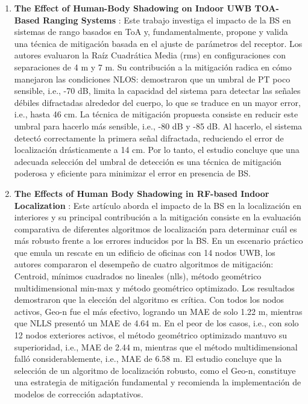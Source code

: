 \begin{enumerate}
    \item \textbf{The Effect of Human-Body Shadowing on Indoor UWB TOA-Based Ranging Systems} \cite{ref18}: Este trabajo investiga el impacto de la BS en sistemas de rango basados en ToA y, fundamentalmente, propone y valida una técnica de mitigación basada en el ajuste de parámetros del receptor. Los autores evaluaron la Raíz Cuadrática Media (\gls{rms}) en configuraciones con separaciones de 4 m y 7 m. Su contribución a la mitigación radica en cómo manejaron las condiciones NLOS: demostraron que un umbral de PT poco sensible, i.e., -70 dB, limita la capacidad del sistema para detectar las señales débiles difractadas alrededor del cuerpo, lo que se traduce en un mayor error, i.e., hasta 46 cm. La técnica de mitigación propuesta consiste en reducir este umbral para hacerlo más sensible, i.e., -80 dB y -85 dB. Al hacerlo, el sistema detectó correctamente la primera señal difractada, reduciendo el error de localización drásticamente a 14 cm. Por lo tanto, el estudio concluye que una adecuada selección del umbral de detección es una técnica de mitigación poderosa y eficiente para minimizar el error en presencia de BS.

    \item \textbf{The Effects of Human Body Shadowing in RF-based Indoor Localization} \cite{Schimtt2019}: 
    Este artículo aborda el impacto de la BS en la localización en interiores y su principal contribución a la mitigación consiste en la evaluación comparativa de diferentes algoritmos de localización para determinar cuál es más robusto frente a los errores inducidos por la BS. En un escenario práctico que emula un rescate en un edificio de oficinas con 14 nodos UWB, los autores compararon el desempeño de cuatro algoritmos de mitigación: Centroid, mínimos cuadrados no lineales (\gls{nlls}), método geométrico multidimensional min-max y método geométrico optimizado. Los resultados demostraron que la elección del algoritmo es crítica. Con todos los nodos activos, Geo-n fue el más efectivo, logrando un MAE de solo 1.22 m, mientras que NLLS presentó un MAE de 4.64 m. En el peor de los casos, i.e., con solo 12 nodos exteriores activos, el método geométrico optimizado mantuvo su superioridad, i.e., MAE de 2.44 m, mientras que el método multidimensional falló considerablemente, i.e., MAE de 6.58 m. El estudio concluye que la selección de un algoritmo de localización robusto, como el Geo-n, constituye una estrategia de mitigación fundamental y recomienda la implementación de modelos de corrección adaptativos.


\end{enumerate}
